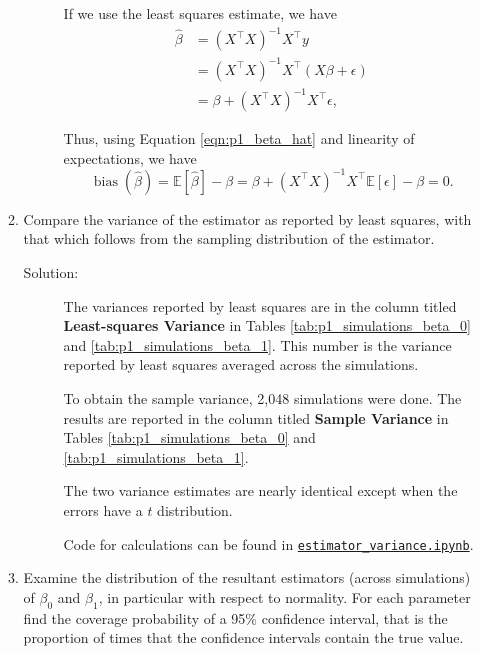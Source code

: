 \documentclass[letterpaper,11pt]{article}
\begin{document}
\begin{enumerate}
\begin{enumerate}
\begin{description}
      If we use the least squares estimate, we have
      \begin{align}
        \hat{\beta}
        &= \left(X^\intercal X\right)^{-1}X^\intercal y \nonumber\\
        &= \left(X^\intercal X\right)^{-1}X^\intercal\left(X\beta + \epsilon \right) \nonumber\\
        &= \beta + \left(X^\intercal X\right)^{-1}X^\intercal\epsilon,
          \label{eqn:p1_beta_hat}
      \end{align}

      Thus, using Equation \ref{eqn:p1_beta_hat} and linearity of expectations,
      we have
      \begin{equation}
        \boxed{
          \operatorname{bias}\left(\hat{\beta}\right) =
          \mathbb{E}\left[\hat{\beta}\right] - \beta =
          \beta +
          \left(X^\intercal X\right)^{-1}X^\intercal
          \mathbb{E}\left[\epsilon\right] - \beta
          = 0.
        }
        \label{eqn:p1_beta_hat_bias}
      \end{equation}
    \end{description}
  \item Compare the variance of the estimator as reported by least squares, with
    that which follows from the sampling distribution of the estimator.

    \begin{description}
    \item[Solution:] The variances reported by least squares are in the column
      titled \textbf{Least-squares Variance} in Tables
      \ref{tab:p1_simulations_beta_0} and \ref{tab:p1_simulations_beta_1}. This
      number is the variance reported by least squares averaged across the
      simulations.

      To obtain the sample variance, 2,048 simulations were done. The results
      are reported in the column titled \textbf{Sample Variance} in Tables
      \ref{tab:p1_simulations_beta_0} and \ref{tab:p1_simulations_beta_1}.

      The two variance estimates are nearly identical except when the errors
      have a $t$ distribution.

      Code for calculations can be found in
      \href{https://nbviewer.jupyter.org/github/ppham27/stat570/blob/master/hw2/estimator\_variance.ipynb}{\texttt{estimator\_variance.ipynb}}.
    \end{description}
    
  \item Examine the distribution of the resultant estimators (across
    simulations) of $\beta_0$ and $\beta_1$, in particular with respect to
    normality. For each parameter find the coverage probability of a 95\%
    confidence interval, that is the proportion of times that the confidence
    intervals contain the true value.


\end{enumerate}
\end{enumerate}
\end{document}
